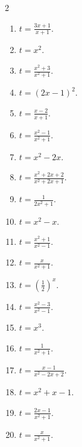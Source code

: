 \documentclass[11pt,a4paper]{article}
\begin{document}
\begin{multicols}{2}
\begin{enumerate}
\item \(\displaystyle t=\frac{3x+1}{x+1}\).
\item \(\displaystyle t=x^2\).
\item \(\displaystyle t=\frac{x^2+3}{x^2+1}\).
\item \(\displaystyle t=\left(2x-1\right)^2\).
\item \(\displaystyle t=\frac{x-2}{x+1}\).
\item \(\displaystyle t=\frac{x^2-1}{x^2+1}\).
\item \(\displaystyle t=x^2-2x\).
\item \(\displaystyle t=\frac{x^2+2x+2}{x^2+2x+1}\).
\item \(\displaystyle t=\frac1{2x^2+1}\).
\item \(\displaystyle t=x^2-x\).
\item \(\displaystyle t=\frac{x^2+1}{x^2-1}\).
\item \(\displaystyle t=\frac{x}{x^2+1}\).
\item \(\displaystyle t=\left(\frac12\right)^x\).
\item \(\displaystyle t=\frac{x^2-3}{x^2-1}\).
\item \(\displaystyle t=x^3\).
\item \(\displaystyle t=\frac1{x^2+1}\).
\item \(\displaystyle t=\frac{x-1}{x^2-2x+2}\).
\item \(\displaystyle t=x^2+x-1\).
\item \(\displaystyle t=\frac{2x-1}{x^2+1}\).
\item \(\displaystyle t=\frac{x}{x^2+1}\).
\end{enumerate}
\end{multicols}
\end{document}
